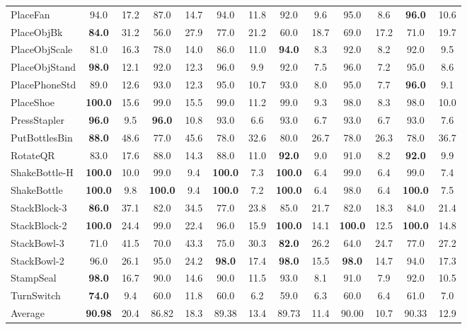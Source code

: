 \documentclass{article}
\begin{document}
\begin{table}[t]
\begin{tabular}{@{}lcccccccccccc@{}}
PlaceFan       & 94.0 & 17.2 & 87.0 & 14.7 & 94.0 & 11.8 & 92.0 & 9.6 & 95.0 & 8.6 & \textbf{96.0} & 10.6 \\
PlaceObjBk     & \textbf{84.0} & 31.2 & 56.0 & 27.9 & 77.0 & 21.2 & 60.0 & 18.7 & 69.0 & 17.2 & 71.0 & 19.7 \\
PlaceObjScale  & 81.0 & 16.3 & 78.0 & 14.0 & 86.0 & 11.0 & \textbf{94.0} & 8.3 & 92.0 & 8.2 & 92.0 & 9.5 \\
PlaceObjStand  & \textbf{98.0} & 12.1 & 92.0 & 12.3 & 96.0 & 9.9 & 92.0 & 7.5 & 96.0 & 7.2 & 95.0 & 8.6 \\
PlacePhoneStd  & 89.0 & 12.6 & 93.0 & 12.3 & 95.0 & 10.7 & 93.0 & 8.0 & 95.0 & 7.7 & \textbf{96.0} & 9.1 \\
PlaceShoe      & \textbf{100.0} & 15.6 & 99.0 & 15.5 & 99.0 & 11.2 & 99.0 & 9.3 & 98.0 & 8.3 & 98.0 & 10.0 \\
PressStapler   & \textbf{96.0} & 9.5 & \textbf{96.0} & 10.8 & 93.0 & 6.6 & 93.0 & 6.7 & 93.0 & 6.7 & 93.0 & 7.6 \\
PutBottlesBin  & \textbf{88.0} & 48.6 & 77.0 & 45.6 & 78.0 & 32.6 & 80.0 & 26.7 & 78.0 & 26.3 & 78.0 & 36.7 \\
RotateQR       & 83.0 & 17.6 & 88.0 & 14.3 & 88.0 & 11.0 & \textbf{92.0} & 9.0 & 91.0 & 8.2 & \textbf{92.0} & 9.9 \\
ShakeBottle-H  & \textbf{100.0} & 10.0 & 99.0 & 9.4 & \textbf{100.0} & 7.3 & \textbf{100.0} & 6.4 & 99.0 & 6.4 & 99.0 & 7.4 \\
ShakeBottle    & \textbf{100.0} & 9.8 & \textbf{100.0} & 9.4 & \textbf{100.0} & 7.2 & \textbf{100.0} & 6.4 & 98.0 & 6.4 & \textbf{100.0} & 7.5 \\
StackBlock-3   & \textbf{86.0} & 37.1 & 82.0 & 34.5 & 77.0 & 23.8 & 85.0 & 21.7 & 82.0 & 18.3 & 84.0 & 21.4 \\
StackBlock-2   & \textbf{100.0} & 24.4 & 99.0 & 22.4 & 96.0 & 15.9 & \textbf{100.0} & 14.1 & \textbf{100.0} & 12.5 & \textbf{100.0} & 14.8 \\
StackBowl-3    & 71.0 & 41.5 & 70.0 & 43.3 & 75.0 & 30.3 & \textbf{82.0} & 26.2 & 64.0 & 24.7 & 77.0 & 27.2 \\
StackBowl-2    & 96.0 & 26.1 & 95.0 & 24.2 & \textbf{98.0} & 17.4 & \textbf{98.0} & 15.5 & \textbf{98.0} & 14.7 & 94.0 & 17.3 \\
StampSeal      & \textbf{98.0} & 16.7 & 90.0 & 14.6 & 90.0 & 11.5 & 93.0 & 8.1 & 91.0 & 7.9 & 92.0 & 10.5 \\
TurnSwitch     & \textbf{74.0} & 9.4 & 60.0 & 11.8 & 60.0 & 6.2 & 59.0 & 6.3 & 60.0 & 6.4 & 61.0 & 7.0 \\
\midrule
Average        & \textbf{90.98} & 20.4 & 86.82 & 18.3 & 89.38 & 13.4 & 89.73 & 11.4 & 90.00 & 10.7 & 90.33 & 12.9 \\
\bottomrule
\end{tabular}
\end{table}
\end{document}
